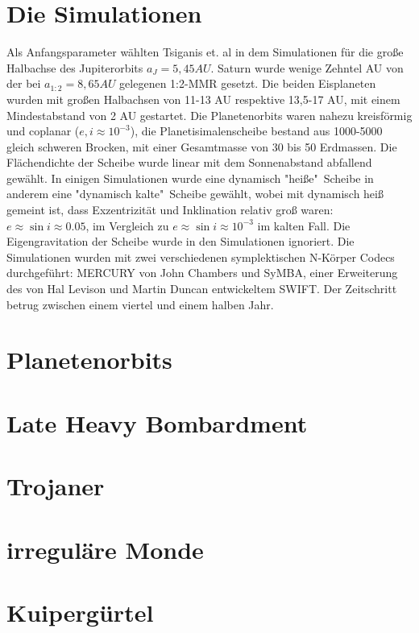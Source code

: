 \documentclass[10pt,a4paper,twoside]{article}
\begin{document}
\section{Die Simulationen} %
Als Anfangsparameter wählten Tsiganis et. al in dem Simulationen für die große Halbachse des Jupiterorbits $a_J = 5,45 AU$. Saturn wurde wenige Zehntel AU von der bei $a_{1:2} = 8,65 AU$ gelegenen 1:2-MMR gesetzt\cite{Tsiganis2005}. Die beiden Eisplaneten wurden mit großen Halbachsen von 11-13 AU respektive 13,5-17 AU, mit einem Mindestabstand von 2 AU gestartet.
Die Planetenorbits waren nahezu kreisförmig und coplanar ($e, i \approx 10^{-3}$), die Planetisimalenscheibe bestand aus 1000-5000 gleich schweren Brocken, mit einer Gesamtmasse von 30 bis 50 Erdmassen. %
Die Flächendichte der Scheibe wurde linear mit dem Sonnenabstand abfallend gewählt. In einigen Simulationen wurde eine dynamisch "heiße"\ Scheibe in anderem eine "dynamisch kalte"\ Scheibe gewählt, wobei mit dynamisch heiß gemeint ist, dass Exzentrizität und Inklination relativ groß waren: $e \approx \sin i \approx 0.05 $, im Vergleich zu $e \approx \sin i \approx 10^{-3} $ im kalten Fall.\cite{Tsiganis2005}
Die Eigengravitation der Scheibe wurde in den Simulationen ignoriert\cite{Tsiganis2005}.
Die Simulationen wurden mit zwei verschiedenen symplektischen N-Körper Codecs durchgeführt: MERCURY von John Chambers und SyMBA, einer Erweiterung des von Hal Levison und Martin Duncan entwickeltem SWIFT.
Der Zeitschritt betrug zwischen einem viertel und einem halben Jahr.\cite{Tsiganis2005} %


\section{Planetenorbits}
\section{Late Heavy Bombardment}
\section{Trojaner}
\section{irreguläre Monde}
\section{Kuipergürtel}
\end{document}
